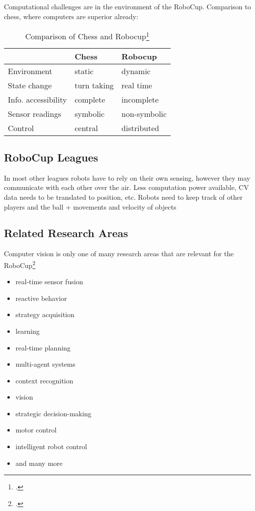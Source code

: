Computational challenges are in the environment of the RoboCup.
Comparison to chess, where computers are superior already:

\begin{table}[htbp]
\centering
\begin{savenotes}
\begin{tabular*}{0.7\textwidth}{p{} p{} p{}}
\toprule
                    &\textbf{Chess} & \textbf{Robocup} \\
\midrule 
Environment         & static		& dynamic \\
State change        & turn taking   & real time \\
Info. accessibility & complete      & incomplete \\
Sensor readings     & symbolic      & non-symbolic \\
Control             & central       & distributed \\
\bottomrule 
\end{tabular*}
  \caption[Comparison of Chess and Robocup]{Comparison of Chess and Robocup\footcite[][]{robo_objectives}}
  \label{tab:chess_comparison}
\end{savenotes}
\end{table}

\subsection{RoboCup Leagues \label{sec:robo-leagues}}
In most other leagues robots have to rely on their own sensing, however they may communicate with each other over the air.
Less computation power available, CV data needs to be translated to position, etc.
Robots need to keep track of other players and the ball + movements and velocity of objects

\subsection{Related Research Areas \label{sec:robo-research}}
Computer vision is only one of many research areas that are relevant for the
RoboCup\footcite[Cf.][]{robo_objectives}
\begin{itemize}
  \item real-time sensor fusion
  \item reactive behavior
  \item strategy acquisition
  \item learning
  \item real-time planning
  \item multi-agent systems
  \item context recognition
  \item vision
  \item strategic decision-making
  \item motor control
  \item intelligent robot control
  \item and many more
\end{itemize}




